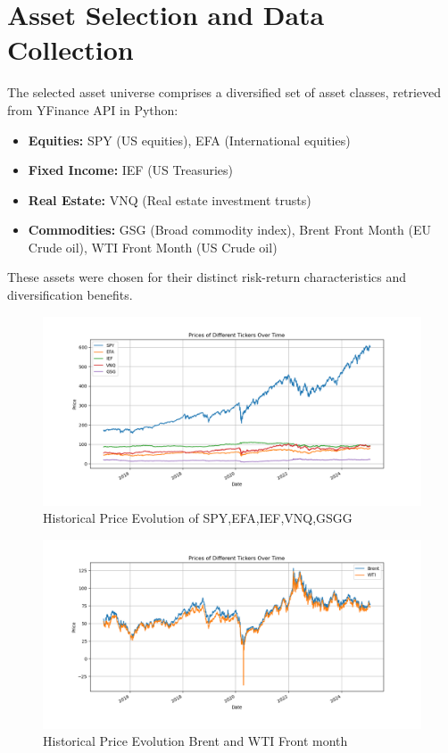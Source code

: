 \documentclass[11pt, oneside, a4paper, titlepage]{report}
\begin{document}
\section{Asset Selection and Data Collection}
The selected asset universe comprises a diversified set of asset classes, retrieved from YFinance API in Python:
\begin{itemize}
    \item \textbf{Equities:} SPY (US equities), EFA (International equities)
    \item \textbf{Fixed Income:} IEF (US Treasuries)
    \item \textbf{Real Estate:} VNQ (Real estate investment trusts)
    \item \textbf{Commodities:} GSG (Broad commodity index), Brent Front Month (EU Crude oil), WTI Front Month (US Crude oil)
\end{itemize}
These assets were chosen for their distinct risk-return characteristics and diversification benefits.

\begin{figure}
    \centering
    \includegraphics[width=1.1\textwidth]{asset_prices.png}
    \caption{Historical Price Evolution of SPY,EFA,IEF,VNQ,GSGG}
\end{figure}

\begin{figure}
    \centering
    \includegraphics[width=1.1\textwidth]{wti_brent.png}
    \caption{Historical Price Evolution Brent and WTI Front month}
\end{figure}
\newpage
\end{document}
